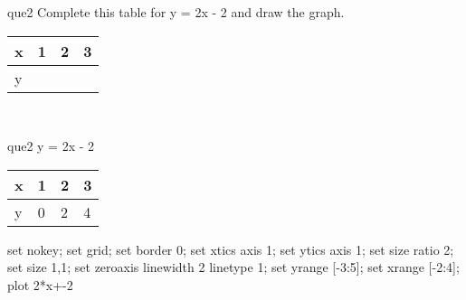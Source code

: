 \documentclass[13.5pt, varwidth=true]{beamer}
\begin{document}
\begin{frame}[shrink=19,fragile]
	\begin{beamercolorbox}[rounded=true, left, shadow=true,wd=14.8cm]{que2}
		 Complete this table for y = 2x - 2 and draw the graph. \\[0.3cm] \renewcommand{\arraystretch}{1.2}\begin{tabular}{|C|C|C|C|} \hline x & 1 & 2 & 3 \\ \hline y & & & \\ \hline \end{tabular}\\[0.3cm]
	\end{beamercolorbox}
\end{frame}
\begin{frame}[shrink=19,fragile]
	\begin{beamercolorbox}[rounded=true, left, shadow=true,wd=14.8cm]{que2}
		y = 2x - 2\renewcommand{\arraystretch}{1.2}\begin{tabular}{|C|C|C|C|} \hline x & 1 & 2 & 3 \\ \hline y & 0 & 2 & 4\\ \hline \end{tabular}\begin{gnuplot}[terminal=pdf] set nokey; set grid; set border 0; set xtics axis 1; set ytics axis 1; set size ratio 2; set size 1,1; set zeroaxis linewidth 2 linetype 1; set yrange [-3:5]; set xrange [-2:4]; plot 2*x+-2 \end{gnuplot}
	\end{beamercolorbox}
\end{frame}
\end{document}
